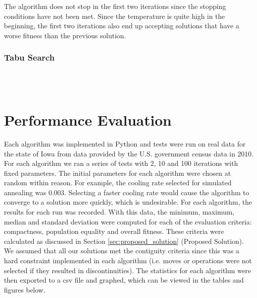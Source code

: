 \documentclass[journal]{IEEEtran}
\begin{document}
The algorithm does not stop in the first two iterations since the stopping conditions have not been met. Since the temperature is quite high in the beginning, the first two iterations also end up accepting solutions that have a worse fitness than the previous solution. \\

\subsubsection{Tabu Search}~\\\\


\section{Performance Evaluation}

Each algorithm was implemented in Python and tests were run on real data for the state of Iowa from data provided by the U.S. government census data in 2010. For each algorithm we ran a series of tests with 2, 10 and 100 iterations with fixed parameters. The initial parameters for each algorithm were chosen at random within reason. For example, the cooling rate selected for simulated annealing was 0.003. Selecting a faster cooling rate would cause the algorithm to converge to a solution more quickly, which is undesirable.
For each algorithm, the results for each run was recorded. With this data, the minimum, maximum, median and standard deviation were computed for each of the evaluation criteria: compactness, population equality and overall fitness. These criteria were calculated as discussed in Section \ref{sec:proposed_solution} (Proposed Solution). We assumed that all our solutions met the contiguity criteria since this was a hard constraint implemented in each algorithm (i.e. moves or operations were not selected if they resulted in discontinuities). The statistics for each algorithm were then exported to a csv file and graphed, which can be viewed in the tables and figures below.
\end{document}

